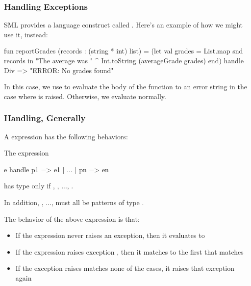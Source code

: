 \documentclass[aspectratio=169]{beamer}
\begin{document}
\begin{frame}[fragile]
  \frametitle{Handling Exceptions}

  SML provides a language construct called . Here's an example
  of how we might use it, instead:

  \pause
  \begin{codeblock}
    fun reportGrades (records : (string * int) list) =
      (let
        val grades = List.map snd records
      in
        "The average was " ^ Int.toString (averageGrade grades)
      end)
      handle Div => "ERROR: No grades found"
  \end{codeblock}

  \pause
  \vspace{\fill}

  In this case, we use  to evaluate the body of the function to
  an error string in the case where  is raised. Otherwise, we
  evaluate normally.
\end{frame}

\begin{frame}[fragile]
  \frametitle{Handling, Generally}

  A  expression has the following behaviors:

  \pause
  \vspace{\fill}

  The expression
  \begin{codeblock}
    e handle p1 => e1 | ... | pn => en
  \end{codeblock}

  has type  only if , , ..., .

  \pause
  \vspace{5pt}

  In addition, , ...,  must all be patterns of type
  .

  \pause
  \vspace{\fill}

  The behavior of the above  expression is that: \pause
  \begin{itemize}
    \item If the expression  never raises an exception, then it
    evaluates to  \pause
    \item If the expression  raises exception , then
    it matches to the first  that matches  \pause
    \item If the exception  raises matches none of the
     cases, it raises that exception again
  \end{itemize}
\end{frame}
\end{document}

